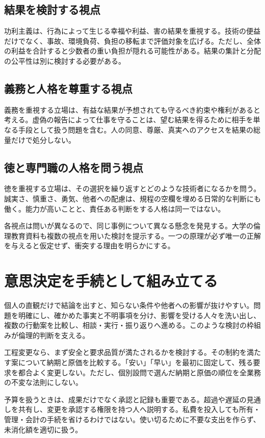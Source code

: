 \subsection{結果を検討する視点}
功利主義は、行為によって生じる幸福や利益、害の結果を重視する。技術の便益だけでなく、事故、環境負荷、負担の移転まで評価対象を広げる。ただし、全体の利益を合計すると少数者の重い負担が隠れる可能性がある。結果の集計と分配の公平性は別に検討する必要がある。

\subsection{義務と人格を尊重する視点}
義務を重視する立場は、有益な結果が予想されても守るべき約束や権利があると考える。虚偽の報告によって仕事を守ることは、望む結果を得るために相手を単なる手段として扱う問題を含む。人の同意、尊厳、真実へのアクセスを結果の総量だけで処分しない。

\subsection{徳と専門職の人格を問う視点}
徳を重視する立場は、その選択を繰り返すとどのような技術者になるかを問う。誠実さ、慎重さ、勇気、他者への配慮は、規程の空欄を埋める日常的な判断にも働く。能力が高いことと、責任ある判断をする人格は同一ではない。

各視点は問いが異なるので、同じ事例について異なる懸念を発見する。大学の倫理教育資料も複数の視点を用いた検討を提示する\parencite{scu_ethics_framework}。一つの原理が必ず唯一の正解を与えると仮定せず、衝突する理由を明らかにする。

\section{意思決定を手続として組み立てる}
\label{theory:ethics:procedure}
個人の直観だけで結論を出すと、知らない条件や他者への影響が抜けやすい。問題を明確にし、確かめた事実と不明事項を分け、影響を受ける人々を洗い出し、複数の行動案を比較し、相談・実行・振り返りへ進める。このような検討の枠組みが倫理的判断を支える\parencite{davis_seven_steps}。

工程変更なら、まず安全と要求品質が満たされるかを検討する。その制約を満たす案について納期と原価を比較する。「安い」「早い」を最初に固定して、残る要求を都合よく変更しない。ただし、個別設問で選んだ納期と原価の順位を全業務の不変な法則にしない。

予算を扱うときは、成果だけでなく承認と記録も重要である。超過や遅延の見通しを共有し、変更を承認する権限を持つ人へ説明する。私費を投入しても所有・管理・会計の手続を省けるわけではない。使い切るために不要な支出を作らず、未消化額を適切に扱う。

